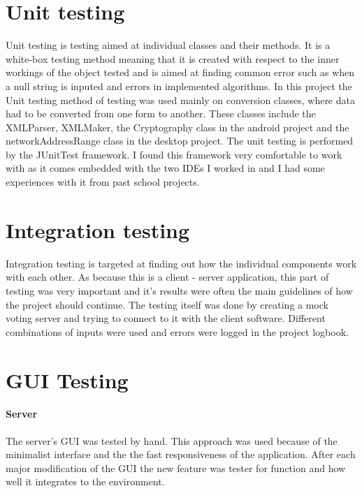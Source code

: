 \documentclass[11pt,twoside,a4paper]{book}
\begin{document}
\section{Unit testing}
Unit testing is testing aimed at individual classes and their methods. It is a white-box testing method meaning that it is created with respect to the inner workings of the object tested and is aimed at finding common error such as when a null string is inputed and errors in implemented algorithms. In this project the Unit testing method of testing was used mainly on conversion classes, where data had to be converted from one form to another. These classes include the XMLParser, XMLMaker, the Cryptography class in the android project and the networkAddressRange class in the desktop project. The unit testing is performed by the JUnitTest framework\cite{junit}. I found this framework very comfortable to work with as it comes embedded with the two IDEs I worked in and I had some experiences with it from past school projects.
\section{Integration testing}
Integration testing is targeted at finding out how the individual components work with each other. As because this is a client - server application, this part of testing was very important and it's results were often the main guidelines of how the project should continue. The testing itself was done by creating a mock voting server and trying to connect to it with the client software. Different combinations of inputs were used and errors were logged in the project logbook.
\section{GUI Testing}
\paragraph{Server}
The server's GUI was tested by hand. This approach was used because of the minimalist interface and the the fast responsiveness of the application. After each major modification of the GUI the new feature was tester for function and how well it integrates to the environment.
\end{document}
